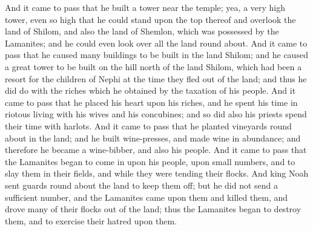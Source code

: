 And it came to pass that he built a tower near the temple; yea, a very high tower, even so high that he could stand upon the top thereof and overlook the land of Shilom, and also the land of Shemlon, which was possessed by the Lamanites; and he could even look over all the land round about.
\bverse \iffalse And it came to pass that he caused many buildings to be built in the land Shilom; and he caused a great tower to be built on the hill north of the land Shilom, which had been a resort for the children of Nephi at the time they fled out of the land; and thus he did do with the riches which he obtained by the taxation of his people. \fi
And it came to pass that he caused many buildings to be built in the land Shilom; and he caused a great tower to be built on the hill north of the land Shilom, which had been a resort for the children of Nephi at the time they fled out of the land; and thus he did do with the riches which he obtained by the taxation of his people.
\bverse \iffalse And it came to pass that he placed his heart upon his riches, and he spent his time in riotous living with his wives and his concubines; and so did also his priests spend their time with harlots. \fi
And it came to pass that he placed his heart upon his riches, and he spent his time in riotous living with his wives and his concubines; and so did also his priests spend their time with harlots.
\bverse \iffalse And it came to pass that he planted vineyards round about in the land; and he built wine-presses, and made wine in abundance; and therefore he became a wine-bibber, and also his people. \fi
And it came to pass that he planted vineyards round about in the land; and he built wine-presses, and made wine in abundance; and therefore he became a wine-bibber, and also his people.
\bverse \iffalse And it came to pass that the Lamanites began to come in upon his people, upon small numbers, and to slay them in their fields, and while they were tending their flocks. \fi
And it came to pass that the Lamanites began to come in upon his people, upon small numbers, and to slay them in their fields, and while they were tending their flocks.
\bverse \iffalse And king Noah sent guards round about the land to keep them off; but he did not send a sufficient number, and the Lamanites came upon them and killed them, and drove many of their flocks out of the land; thus the Lamanites began to destroy them, and to exercise their hatred upon them. \fi
And king Noah sent guards round about the land to keep them off; but he did not send a sufficient number, and the Lamanites came upon them and killed them, and drove many of their flocks out of the land; thus the Lamanites began to destroy them, and to exercise their hatred upon them.
